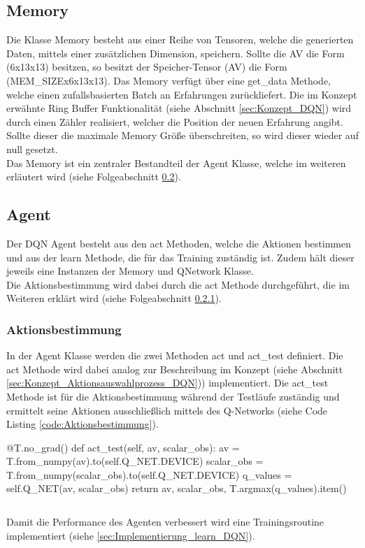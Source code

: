 \subsection{Memory} \label{sec:Implementierung_Memory}
Die Klasse Memory besteht aus einer Reihe von Tensoren, welche die generierten Daten, mittels einer zusätzlichen Dimension, speichern.
Sollte die AV die Form (6x13x13) besitzen, so besitzt der Speicher-Tensor (AV) die Form (MEM\_SIZEx6x13x13).
Das Memory verfügt über eine get\_data Methode, welche einen zufallsbasierten Batch an Erfahrungen zurückliefert. Die im Konzept erwähnte Ring Buffer Funktionalität (siehe Abschnitt \ref{sec:Konzept_DQN}) wird durch einen Zähler realisiert, welcher die Position der neuen Erfahrung angibt. Sollte dieser die maximale Memory Größe überschreiten, so wird dieser wieder auf null gesetzt.\\
Das Memory ist ein zentraler Bestandteil der Agent Klasse, welche im weiteren erläutert wird (siehe Folgeabschnitt \ref{sec:Implementierung_DQN_Agent}).

\subsection{Agent} \label{sec:Implementierung_DQN_Agent}
Der DQN Agent besteht aus den act Methoden, welche die Aktionen bestimmen und aus der learn Methode, die für das Training zuständig ist. Zudem hält dieser jeweils eine Instanzen der Memory und QNetwork Klasse.\\
Die Aktionsbestimmung wird dabei durch die act Methode durchgeführt, die im Weiteren erklärt wird (siehe Folgeabschnitt \ref{sec:Implementierung_act_DQN}).

\subsubsection{Aktionsbestimmung} \label{sec:Implementierung_act_DQN}
In der Agent Klasse werden die zwei Methoden act und act\_test definiert. Die act Methode wird dabei analog zur Beschreibung im Konzept (siehe Abschnitt \ref{sec:Konzept_Aktionsauswahlprozess_DQN})) implementiert.
Die act\_test Methode ist für die Aktionsbestimmung während der Testläufe zuständig und ermittelt seine Aktionen ausschließlich mittels des Q-Networks (siehe Code Listing \ref{code:Aktionsbestimmung}).
\begin{python}
@T.no_grad()
def act_test(self, av, scalar_obs):
	av = T.from_numpy(av).to(self.Q_NET.DEVICE)
	scalar_obs = T.from_numpy(scalar_obs).to(self.Q_NET.DEVICE)
	q_values = self.Q_NET(av, scalar_obs)
	return av, scalar_obs, T.argmax(q_values).item()
\end{python}
\begin{lstlisting}[caption=Aktionsbestimmung, label=code:Aktionsbestimmung]
\end{lstlisting}
Damit die Performance des Agenten verbessert wird eine Trainingsroutine implementiert (siehe \ref{sec:Implementierung_learn_DQN}).

